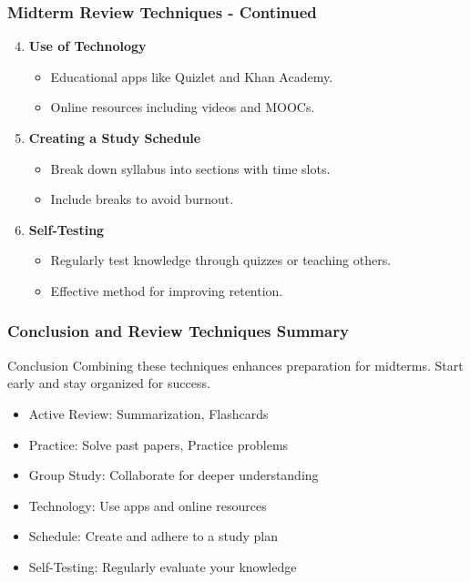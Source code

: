 \documentclass[aspectratio=169]{beamer}
\begin{document}
\begin{frame}[fragile]
    \frametitle{Midterm Review Techniques - Continued}
    \begin{enumerate}
        \setcounter{enumi}{3} %
        \item \textbf{Use of Technology}
            \begin{itemize}
                \item Educational apps like Quizlet and Khan Academy.
                \item Online resources including videos and MOOCs.
            \end{itemize}
        
        \item \textbf{Creating a Study Schedule}
            \begin{itemize}
                \item Break down syllabus into sections with time slots.
                \item Include breaks to avoid burnout.
            \end{itemize}
        
        \item \textbf{Self-Testing}
            \begin{itemize}
                \item Regularly test knowledge through quizzes or teaching others.
                \item Effective method for improving retention.
            \end{itemize}
    \end{enumerate}
\end{frame}

\begin{frame}[fragile]
    \frametitle{Conclusion and Review Techniques Summary}
    \begin{block}{Conclusion}
        Combining these techniques enhances preparation for midterms. Start early and stay organized for success.
    \end{block}
    
    \begin{itemize}
        \item Active Review: Summarization, Flashcards  
        \item Practice: Solve past papers, Practice problems  
        \item Group Study: Collaborate for deeper understanding  
        \item Technology: Use apps and online resources  
        \item Schedule: Create and adhere to a study plan  
        \item Self-Testing: Regularly evaluate your knowledge  
    \end{itemize}
\end{frame}
\end{document}
